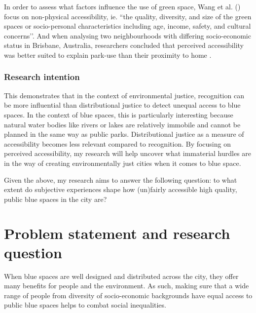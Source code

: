 \documentclass{article}
\begin{document}
In order to assess what factors influence the use of green space, Wang et al. (\citeyear{wang2015physical}) focus on non-physical accessibility, ie. “the quality, diversity, and size of the green spaces or socio-personal characteristics including age, income, safety, and cultural concerns’’. 
And when analysing two neighbourhoods with differing socio-economic status in Brisbane, Australia, researchers concluded that perceived accessibility was better suited to explain park-use than their proximity to home \parencite{wang2015comparison}.

\subsubsection{Research intention}

This demonstrates that in the context of environmental justice, recognition can be more influential than distributional justice to detect unequal access to blue spaces. In the context of blue spaces, this is particularly interesting because natural water bodies like rivers or lakes are relatively immobile and cannot be planned in the same way as public parks. Distributional justice as a measure of accessibility becomes less relevant compared to recognition.
By focusing on perceived accessibility, my research will help uncover what immaterial hurdles are in the way of creating environmentally just cities when it comes to blue space.

Given the above, my research aims to answer the following question: to what extent do subjective experiences shape how (un)fairly accessible high quality, public blue spaces in the city are?


\section{Problem statement and research question}

When blue spaces are well designed and distributed across the city, they offer many benefits for people and the environment. As such, making sure that a wide range of people from diversity of socio-economic backgrounds have equal access to public blue spaces helps to combat social inequalities. 
\end{document}
